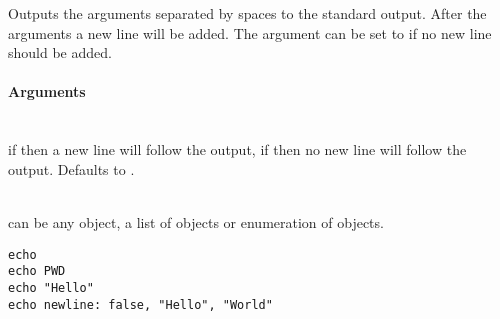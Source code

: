 %


Outputs the arguments separated by spaces to the standard output. After 
the arguments a new line will be added. The argument  can be set
to  if no new line should be added.

\paragraph{Arguments}

\begin{asparadesc}
%
\item[\code{newLine: true|false}]  \hfill \\
if  then a new line will follow the output,
if  then no new line will follow the output. Defaults to .
%
\item[\code{arguments\dots}]  \hfill \\
can be any object, a list of objects or enumeration of objects.
%
\end{asparadesc}

\begin{lstlisting}[style=Groovybash, label={lst:example_echo}]
echo
echo PWD
echo "Hello"
echo newline: false, "Hello", "World"
\end{lstlisting}

